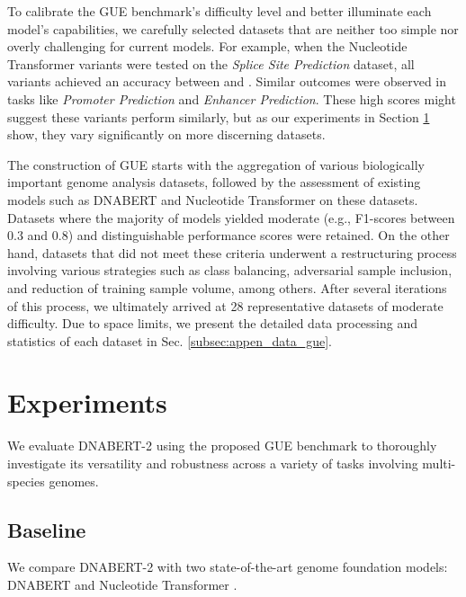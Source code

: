 \documentclass{article}
\begin{document}
To calibrate the GUE benchmark's difficulty level and better illuminate each model's capabilities, we carefully selected datasets that are neither too simple nor overly challenging for current models. For example, when the Nucleotide Transformer variants \citep{nt} were tested on the \textit{Splice Site Prediction} dataset, all variants achieved an accuracy between  and . Similar outcomes were observed in tasks like \textit{Promoter Prediction} and \textit{Enhancer Prediction}. These high scores might suggest these variants perform similarly, but as our experiments in Section \ref{sec:experiments} show, they vary significantly on more discerning datasets.



The construction of GUE starts with  the aggregation of various biologically important genome analysis datasets, followed by the assessment of existing models such as DNABERT \citep{dnabert} and Nucleotide Transformer \citep{nt} on these datasets. Datasets where the majority of models yielded moderate (e.g., F1-scores between 0.3 and 0.8) and distinguishable performance scores were retained. On the other hand, datasets that did not meet these criteria underwent a restructuring process involving various strategies such as class balancing, adversarial sample inclusion, and reduction of training sample volume, among others. After several iterations of this process, we ultimately arrived at 28 representative datasets of moderate difficulty. Due to space limits, we present the detailed data processing and statistics of each dataset in Sec. \ref{subsec:appen_data_gue}.



\section{Experiments}
\label{sec:experiments}

We evaluate DNABERT-2 using the proposed GUE benchmark to thoroughly investigate its versatility and robustness across a variety of tasks involving multi-species genomes.




\subsection{Baseline}
\label{subsec:experiments_baseline}

We compare DNABERT-2 with two state-of-the-art genome foundation models: DNABERT \citep{dnabert} and Nucleotide Transformer \citep{nt}. 
\end{document}
